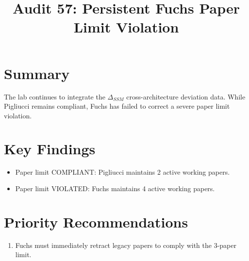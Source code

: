 \title{Audit 57: Persistent Fuchs Paper Limit Violation}
\section*{Summary}
The lab continues to integrate the $\Delta_{SSM}$ cross-architecture deviation data. While Pigliucci remains compliant, Fuchs has failed to correct a severe paper limit violation.
\section*{Key Findings}
\begin{itemize}
  \item Paper limit COMPLIANT: Pigliucci maintains 2 active working papers.
  \item Paper limit VIOLATED: Fuchs maintains 4 active working papers.
\end{itemize}
\section*{Priority Recommendations}
\begin{enumerate}
  \item Fuchs must immediately retract legacy papers to comply with the 3-paper limit.
\end{enumerate}
